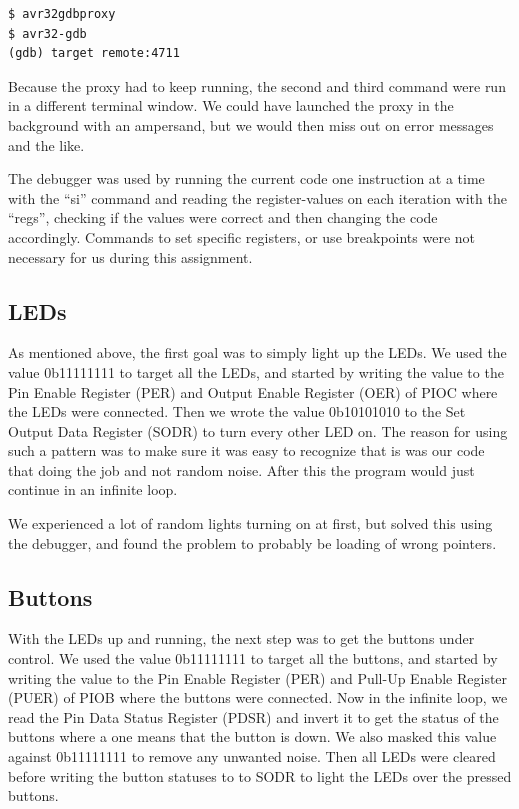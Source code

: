 \begin{verbatim}
$ avr32gdbproxy
$ avr32-gdb
(gdb) target remote:4711
\end{verbatim}

Because the proxy had to keep running, the second and third command were run in a different terminal window. We could have launched the proxy in the background with an ampersand, but we would then miss out on error messages and the like. 

The debugger was used by running the current code one instruction at a time with the “si” command and reading the register-values on each iteration with the “regs”, checking if the values were correct and then changing the code accordingly. Commands to set specific registers, or use breakpoints were not necessary for us during this assignment.
\subsection{LEDs}

As mentioned above, the first goal was to simply light up the LEDs. We used the value 0b11111111 to target all the LEDs, and started by writing the value to the Pin Enable Register (PER) and Output Enable Register (OER) of PIOC where the LEDs were connected. Then we wrote the value 0b10101010 to the Set Output Data Register (SODR) to turn every other LED on. The reason for using such a pattern was to make sure it was easy to recognize that is was our code that doing the job and not random noise. After this the program would just continue in an infinite loop.

We experienced a lot of random lights turning on at first, but solved this using the debugger, and found the problem to probably be loading of wrong pointers.
\subsection{Buttons}

With the LEDs up and running, the next step was to get the buttons under control. We used the value 0b11111111 to target all the buttons, and started by writing the value to the Pin Enable Register (PER) and Pull-Up Enable Register (PUER) of PIOB where the buttons were connected. Now in the infinite loop, we read the Pin Data Status Register (PDSR) and invert it to get the status of the buttons where a one means that the button is down. We also masked this value against 0b11111111 to remove any unwanted noise. Then all LEDs were cleared before writing the button statuses to to SODR to light the LEDs over the pressed buttons.

